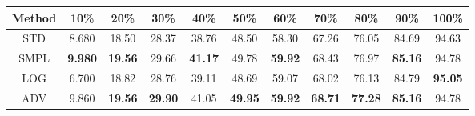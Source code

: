 \documentclass{standalone}
\begin{document}
\begin{tabular}{c|cccccccccc}
      \toprule
      Method & 10\% & 20\% & 30\% & 40\% & 50\% & 60\% & 70\% & 80\% & 90\% & 100\% \\
      \midrule
STD & 8.680 & 18.50 & 28.37 & 38.76 & 48.50 & 58.30 & 67.26 & 76.05 & 84.69 & 94.63\\
SMPL & \textbf{9.980} & \textbf{19.56} & 29.66 & \textbf{41.17} & 49.78 & \textbf{59.92} & 68.43 & 76.97 & \textbf{85.16} & 94.78\\
LOG & 6.700 & 18.82 & 28.76 & 39.11 & 48.69 & 59.07 & 68.02 & 76.13 & 84.79 & \textbf{95.05}\\
ADV & 9.860 & \textbf{19.56} & \textbf{29.90} & 41.05 & \textbf{49.95} & \textbf{59.92} & \textbf{68.71} & \textbf{77.28} & \textbf{85.16} & 94.78\\
  \bottomrule
\end{tabular}
\end{document}
